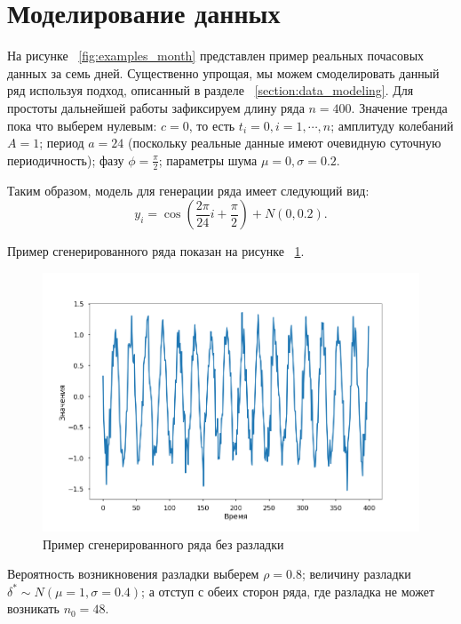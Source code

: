 \documentclass[%
12pt,
master,  %
natbib,      %
subf,        %
substylefile = spbu.rtx,
href,        %
colorlinks,  %
]{disser}
\begin{document}
\section{Моделирование данных}

На рисунке ~\ref{fig:examples_month} представлен пример реальных почасовых данных за семь дней. Существенно упрощая, мы можем смоделировать данный ряд используя подход, описанный в разделе ~\ref{section:data_modeling}. Для простоты дальнейшей работы зафиксируем длину ряда $n = 400$. Значение тренда пока что выберем нулевым: $c = 0$, то есть $t_i = 0, i = 1,\cdots, n$; амплитуду колебаний $A = 1$; период $ a = 24 $ (поскольку реальные данные имеют очевидную суточную периодичность); фазу $\phi = \frac{\pi}{2}$; параметры шума $\mu = 0, \sigma = 0.2$.

Таким образом, модель для генерации ряда имеет следующий вид:
\begin{equation*} y_i = \cos \left( \frac{2\pi}{24}i + \frac{\pi}{2} \right) + N(0,0.2).\end{equation*}

Пример сгенерированного ряда показан на рисунке ~\ref{fig:data_modeling_example_1}.

\begin{figure}[!hhh]
	\begin{center}
		\includegraphics[width=12cm]{data_modeling_example_1}
	\end{center}
	\vspace{-5mm}\caption{Пример сгенерированного ряда без разладки}
	\label{fig:data_modeling_example_1}
\end{figure}

Вероятность возникновения разладки выберем $\rho = 0.8$; величину разладки $\delta^* \sim N(\mu = 1,\sigma = 0.4)$; а отступ с обеих сторон ряда, где разладка не может возникать $n_0 = 48$.
\end{document}
